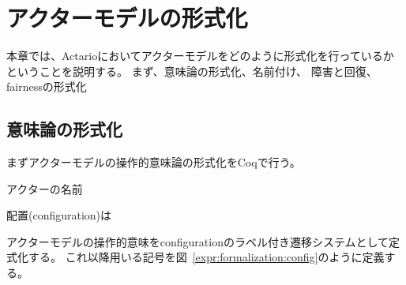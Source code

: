 \chapter{アクターモデルの形式化}
\label{chapter:formalization}

本章では、Actarioにおいてアクターモデルをどのように形式化を行っているかということを説明する。
まず、意味論の形式化、名前付け、
障害と回復、fairnessの形式化

\section{意味論の形式化}

まずアクターモデルの操作的意味論の形式化をCoqで行う。

アクターの名前

配置(configuration)は

アクターモデルの操作的意味をconfigurationのラベル付き遷移システムとして定式化する。
これ以降用いる記号を図~\ref{expr:formalization:config}のように定義する。

